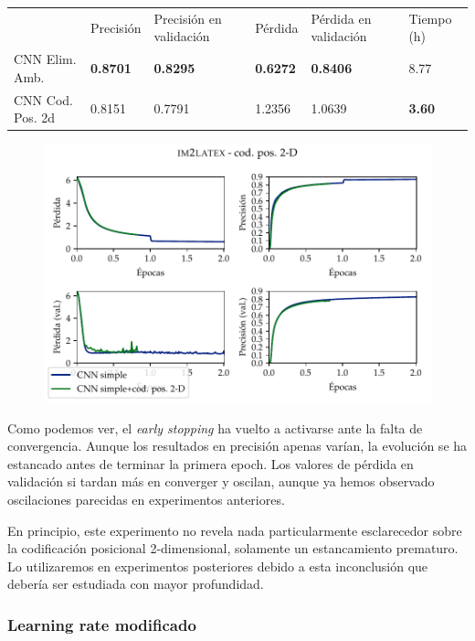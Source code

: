 \documentclass[a4paper, 20pt, dvipsnames]{article}
\begin{document}
\begin{table}[H]
	\centering
	\begin{tabular}{llllll}
		& Precisión       & Precisión en validación & Pérdida         & Pérdida en validación & Tiempo (h)    \\ \cline{2-6} 
		CNN Elim. Amb.   & \textbf{0.8701} & \textbf{0.8295}         & \textbf{0.6272} & \textbf{0.8406}       & 8.77          \\
		CNN Cod. Pos. 2d & 0.8151          & 0.7791                  & 1.2356          & 1.0639                & \textbf{3.60}
	\end{tabular}
\end{table}

\begin{figure}[H]
	\centering
	\includegraphics{fig/im2latex-3c.pdf}
\end{figure}

Como podemos ver, el \emph{early stopping} ha vuelto a activarse ante la falta de
convergencia. Aunque los resultados en precisión apenas varían, la evolución se ha
estancado antes de terminar la primera epoch. Los valores de pérdida en validación
si tardan más en converger y oscilan, aunque ya hemos observado oscilaciones
parecidas en experimentos anteriores.

En principio, este experimento no revela nada particularmente esclarecedor sobre la
codificación posicional 2-dimensional, solamente un estancamiento prematuro. Lo
utilizaremos en experimentos posteriores debido a esta inconclusión que debería
ser estudiada con mayor profundidad. 


\subsubsection{Learning rate modificado}
\end{document}
